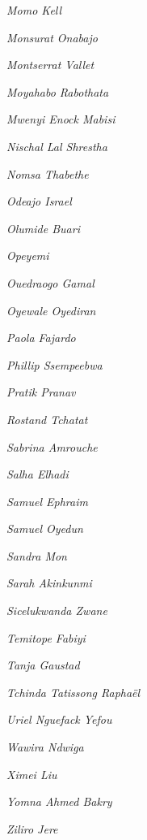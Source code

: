 \begin{multicols}{3}
\textit{Momo Kell} 

\textit{Monsurat Onabajo}

\textit{Montserrat Vallet} 

\textit{Moyahabo Rabothata}

\textit{Mwenyi Enock Mabisi} 

\textit{Nischal Lal Shrestha} 

\textit{Nomsa Thabethe}

\textit{Odeajo Israel}

\textit{Olumide Buari}

\textit{Opeyemi}

\textit{Ouedraogo Gamal}

\textit{Oyewale Oyediran} 

\textit{Paola Fajardo}

\textit{Phillip Ssempeebwa}

\textit{Pratik Pranav}

\textit{Rostand Tchatat} 

\textit{Sabrina Amrouche}

\textit{Salha Elhadi}

\textit{Samuel Ephraim}

\textit{Samuel Oyedun} 

\textit{Sandra Mon}

\textit{Sarah Akinkunmi}

\textit{Sicelukwanda Zwane} 

\textit{Temitope Fabiyi}

\textit{Tanja Gaustad}  

\textit{Tchinda Tatissong Raphaël} 

\textit{Uriel Nguefack Yefou} 

\textit{Wawira Ndwiga} 

\textit{Ximei Liu}

\textit{Yomna Ahmed Bakry}

\textit{Ziliro Jere} 

\end{multicols}